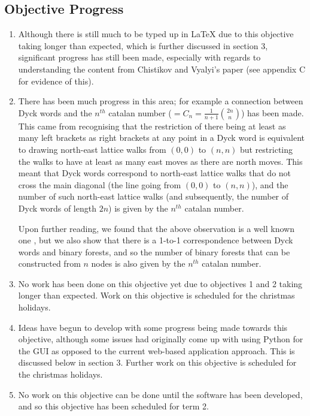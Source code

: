 \documentclass[a4paper]{article}
\begin{document}
	\subsection{Objective Progress}
	\begin{enumerate}
		\item Although there is still much to be typed up in LaTeX due to this objective taking longer than expected, which is further discussed in section 3, significant progress has still been made, especially with regards to understanding the content from Chistikov and Vyalyi's paper (see appendix C for evidence of this). 
		\item There has been much progress in this area; for example a connection between Dyck words and the $n^{th}$ catalan number ($ = C_n = \frac{1}{n+1} {2n \choose n}$) has been made. This came from recognising that the restriction of there being at least as many left brackets as right brackets at any point in a Dyck word is equivalent to drawing north-east lattice walks from $(0,0)$ to $(n,n)$ but restricting the walks to have at least as many east moves as there are north moves. This meant that Dyck words correspond to north-east lattice walks that do not cross the main diagonal (the line going from $(0,0)$ to $(n,n)$), and the number of such north-east lattice walks (and subsequently, the number of Dyck words of length $2n$) is given by the $n^{th}$ catalan number. 
		
		Upon further reading, we found that the above observation is a well known one \cite{fukukawa2013counting}, but we also show that there is a 1-to-1 correspondence between Dyck words and binary forests, and so the number of binary forests that can be constructed from $n$ nodes is also given by the $n^{th}$ catalan number.
		\item No work has been done on this objective yet due to objectives 1 and 2 taking longer than expected.  Work on this objective is scheduled for the christmas holidays.
		\item Ideas have begun to develop with some progress being made towards this objective, although some issues had originally come up with using Python for the GUI as opposed to the current web-based application approach. This is discussed below in section 3. Further work on this objective is scheduled for the christmas holidays.
		\item No work on this objective can be done until the software has been developed, and so this objective has been scheduled for term 2.
	\end{enumerate}
	
\end{document}
